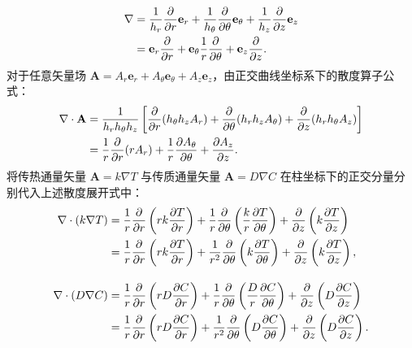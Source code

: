 \documentclass[12pt,a4paper]{ctexart}
\begin{document}
\begin{align}
\nabla &= \frac{1}{h_r}\frac{\partial}{\partial r}\mathbf{e}_r + \frac{1}{h_\theta}\frac{\partial}{\partial\theta}\mathbf{e}_\theta + \frac{1}{h_z}\frac{\partial}{\partial z}\mathbf{e}_z \notag\\
&= \mathbf{e}_r\frac{\partial}{\partial r} + \mathbf{e}_\theta\frac1r\frac{\partial}{\partial\theta} + \mathbf{e}_z\frac{\partial}{\partial z}.\label{eq:grad_cyl}
\end{align}
对于任意矢量场 $\mathbf{A}=A_r\mathbf{e}_r+A_\theta\mathbf{e}_\theta+A_z\mathbf{e}_z$，由正交曲线坐标系下的散度算子公式：
\begin{align}
\nabla\cdot\mathbf{A} &= \frac{1}{h_rh_\theta h_z}\left[\frac{\partial}{\partial r}(h_\theta h_zA_r) + \frac{\partial}{\partial\theta}(h_rh_zA_\theta) + \frac{\partial}{\partial z}(h_rh_\theta A_z)\right] \notag\\
&= \frac1r\frac{\partial}{\partial r}(rA_r) + \frac1r\frac{\partial A_\theta}{\partial\theta} + \frac{\partial A_z}{\partial z}.\label{eq:div_cyl}
\end{align}
将传热通量矢量 $\mathbf{A}=k\nabla T$ 与传质通量矢量 $\mathbf{A}=D\nabla C$ 在柱坐标下的正交分量分别代入上述散度展开式中：
\begin{align}
\nabla\cdot(k\nabla T) &= \frac1r\frac{\partial}{\partial r}\left(rk\frac{\partial T}{\partial r}\right) + \frac1r\frac{\partial}{\partial\theta}\left(\frac{k}{r}\frac{\partial T}{\partial\theta}\right) + \frac{\partial}{\partial z}\left(k\frac{\partial T}{\partial z}\right)\notag\\
&= \frac1r\frac{\partial}{\partial r}\left(rk\frac{\partial T}{\partial r}\right) + \frac{1}{r^2}\frac{\partial}{\partial\theta}\left(k\frac{\partial T}{\partial\theta}\right) + \frac{\partial}{\partial z}\left(k\frac{\partial T}{\partial z}\right),\label{eq:div_heat_cyl}\\[10pt]
\nabla\cdot(D\nabla C) &= \frac1r\frac{\partial}{\partial r}\left(rD\frac{\partial C}{\partial r}\right) + \frac1r\frac{\partial}{\partial\theta}\left(\frac{D}{r}\frac{\partial C}{\partial\theta}\right) + \frac{\partial}{\partial z}\left(D\frac{\partial C}{\partial z}\right)\notag\\
&= \frac1r\frac{\partial}{\partial r}\left(rD\frac{\partial C}{\partial r}\right) + \frac{1}{r^2}\frac{\partial}{\partial\theta}\left(D\frac{\partial C}{\partial\theta}\right) + \frac{\partial}{\partial z}\left(D\frac{\partial C}{\partial z}\right).\label{eq:div_mass_cyl}
\end{align}
\end{document}
